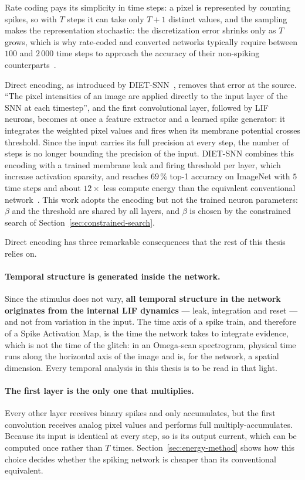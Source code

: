 Rate coding pays its simplicity in time steps: a pixel is represented by
counting spikes, so with $T$ steps it can take only $T + 1$ distinct values, and
the sampling makes the representation stochastic: the discretization error
shrinks only as $T$ grows, which is why rate-coded and converted networks
typically require between $100$ and $2\,000$ time steps to approach the
accuracy of their non-spiking counterparts~\cite{rathi2023dietsnn}.

Direct encoding, as introduced by DIET-SNN~\cite{rathi2023dietsnn}, removes
that error at the source. ``The pixel intensities of an image are applied
directly to the input layer of the SNN at each timestep'', and the first
convolutional layer, followed by LIF neurons, becomes at once a feature
extractor and a learned spike generator: it integrates the weighted pixel
values and fires when its membrane potential crosses threshold. Since the
input carries its full precision at every step, the number of steps is no longer
bounding the precision of the input. DIET-SNN combines this encoding with a
trained membrane leak and firing threshold per layer, which increase activation
sparsity, and reaches $69\,\%$ top-1 accuracy on ImageNet with $5$ time steps
and about $12\times$ less compute energy than the equivalent conventional
network~\cite{rathi2023dietsnn}. This work adopts the encoding but not the
trained neuron parameters: $\beta$ and the threshold are shared by all layers,
and $\beta$ is chosen by the constrained search of
Section~\ref{sec:constrained-search}.

Direct encoding has three remarkable consequences that the rest of this thesis relies on.

\paragraph{Temporal structure is generated inside the network.} Since the
stimulus does not vary, \textbf{all temporal structure in the network
originates from the internal LIF dynamics} --- leak, integration and reset ---
and not from variation in the input. The time axis of a spike train, and
therefore of a Spike Activation Map, is the time the network takes to integrate
evidence, which is not the time of the glitch: in an Omega-scan spectrogram, physical
time runs along the horizontal axis of the image and is, for the network, a
spatial dimension. Every temporal analysis in this thesis is to be read in that
light.

\paragraph{The first layer is the only one that multiplies.} Every other layer
receives binary spikes and only accumulates, but the first convolution receives
analog pixel values and performs full multiply-accumulates. Because its input is
identical at every step, so is its output current, which can be computed once
rather than $T$ times. Section~\ref{sec:energy-method} shows how this choice
 decides whether the spiking network is cheaper than its conventional
equivalent.

